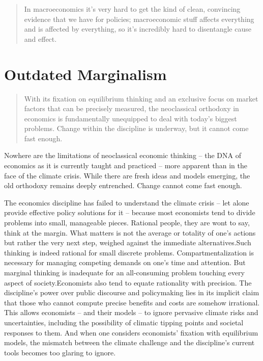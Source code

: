 \documentclass[
]{book}
\begin{document}
\begin{quote}
In macroeconomics it's very hard to get the kind of clean,
convincing evidence that we have for policies;
macroeconomic stuff affects everything and is affected by everything,
so it's incredibly hard to disentangle cause and effect.
\end{quote}

\hypertarget{outdated-marginalism}{%
\section{Outdated Marginalism}\label{outdated-marginalism}}

\begin{quote}
With its fixation on equilibrium thinking and an exclusive focus on market factors that can be precisely measured, the neoclassical orthodoxy in economics is fundamentally unequipped to deal with today's biggest problems. Change within the discipline is underway, but it cannot come fast enough.
\end{quote}

Nowhere are the limitations of neoclassical economic thinking -- the DNA of economics as it is currently taught and practiced -- more apparent than in the face of the climate crisis. While there are fresh ideas and models emerging, the old orthodoxy remains deeply entrenched. Change cannot come fast enough.

The economics discipline has failed to understand the climate crisis -- let alone provide effective policy solutions for it -- because most economists tend to divide problems into small, manageable pieces. Rational people, they are wont to say, think at the margin. What matters is not the average or totality of one's actions but rather the very next step, weighed against the immediate alternatives.Such thinking is indeed rational for small discrete problems. Compartmentalization is necessary for managing competing demands on one's time and attention. But marginal thinking is inadequate for an all-consuming problem touching every aspect of society.Economists also tend to equate rationality with precision. The discipline's power over public discourse and policymaking lies in its implicit claim that those who cannot compute precise benefits and costs are somehow irrational. This allows economists -- and their models -- to ignore pervasive climate risks and uncertainties, including the possibility of climatic tipping points and societal responses to them. And when one considers economists' fixation with equilibrium models, the mismatch between the climate challenge and the discipline's current tools becomes too glaring to ignore.
\end{document}

